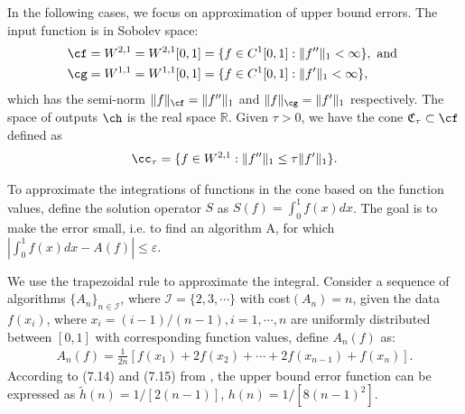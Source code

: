 
\newcommand{\R}{\mathbb{R}}
In the following cases, we focus on approximation of upper bound errors. The input function is in Sobolev space:
\begin{align*}
  \cf&=W^{2,1}=W^{2,1}[0,1]=\{f\in C^1[0,1]: \|f''\|_1<\infty\}, \text{ and }\\
  \cg&=W^{1,1}=W^{1,1}[0,1]=\{f\in C^1[0,1]: \|f'\|_1<\infty\},
\end{align*}
which has the semi-norm $\|f\|_{\cf}=\|f''\|_{1}$ and $\|f\|_{\cg}=\|f'\|_{1}$ respectively. The space of outputs $\ch$ is the real space $\R$. Given $\tau > 0$, we have the cone $\mathfrak{C}_{\tau} \subset \cf$ defined as
\begin{align}\label{coneinteg}
\cc_{\tau}=\{f\in W^{2,1}:\|f''\|_1\leq\tau\|f'\|_1\}.
\end{align}

To approximate the integrations of functions in the cone based on the function values, define the solution operator $S$ as $S(f)=\int_{0}^{1}f(x)dx$. The goal is to make the error small, i.e. to find an algorithm A, for which $|\int_{0}^{1}f(x)dx-A(f)|\leq \varepsilon$.

We use the trapezoidal rule to approximate the integral. Consider a sequence of algorithms $\{A_n\}_{n\in \mathcal{I}}$, where $\mathcal{I}=\{2,3,\cdots\}$ with cost$(A_n)=n$, given the data $f(x_i)$, where $x_i=(i-1)/(n-1), i=1,\cdots,n$ are uniformly distributed between $[0,1]$ with corresponding function values, define $A_n(f)$ as: \begin{align*}
    A_{n}(f)%
    =\frac{1}{2n}[f(x_1)+2f(x_2)+\cdots+2f(x_{n-1})+f(x_n)].
\end{align*}
According to (7.14) and (7.15) from \cite{BraPet11a}, the upper bound error function can be expressed as $\tilde{h}(n)=1/[2(n-1)]$, $h(n)=1/[8(n-1)^2]$.
%
%

